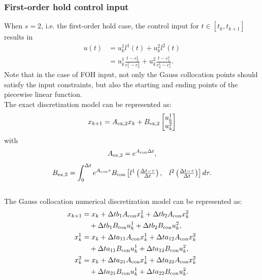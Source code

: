 \subsubsection{First-order hold control input}
When $s = 2$, i.e. the first-order hold case, the control input for $t \in \left[t_k, t_{k+1}\right]$ results in
\begin{equation}
	\begin{split}
        u(t) &= u_k^{1}  l^1(t)+u_k^2  l^2(t)\\
        &= u_k^{1}  \frac{t-c_2^1}{c_1^1-c_2^1} +u_k^2 \frac{t-c_1^1}{c_2^1-c_1^1}.
    \end{split}
\end{equation}
Note that in the case of FOH input, not only the Gauss collocation points should satisfy the input constraints, but also the starting and ending points of the piecewise linear function.
\\
The exact discretization model can be represented as:
\begin{equation}
    x_{k+1} = A_{\rm{ex,2}}x_k+B_{\rm{ex,2}}\begin{bmatrix}
    	u_{k}^1 \\
    	u_{k}^{2}
    \end{bmatrix}
\end{equation}
with
$$
A_{\rm{ex,2}} = e^{A_{\rm{con}}  \Delta t},
$$
$$
B_{\rm{ex,2}} = \int_{0}^{\Delta t} e^{A_{\rm{con}} \tau}  B_{\rm{con}}  \begin{bmatrix}
	l^1\left(\frac{\Delta t - \tau}{\Delta t}\right),      & l^2\left(\frac{\Delta t - \tau}{\Delta t}\right) 
\end{bmatrix}  d \tau.
$$
\\
The Gauss collocation numerical discretization model can be represented as:
\begin{equation}
	\begin{split}
		x_{k+1}&=x_{k}+\Delta t  b_{1}  A_{\rm{con}}  x_{k}^{1}+\Delta t  b_{2}  A_{\rm{con}}  x_{k}^{2} \\ & \quad+\Delta t  b_{1}  B_{\rm{con}}  u_{k}^{1}+\Delta t  b_{2}  B_{\rm{con}}  u_{k}^{2}, \\
		x_{k}^{1}&=x_{k}+\Delta t  a_{11}  A_{\rm{con}}  x_{k}^{1}+\Delta t  a_{12}  A_{\rm{con}}  x_{k}^{2} \\ & \quad +\Delta t  a_{11}  B_{\rm{con}}  u_{k}^{1}+\Delta t  a_{12}  B_{\rm{con}}  u_{k}^{2}, \\
		x_{k}^{2}&=x_{k}+\Delta t  a_{21}  A_{\rm{con}}  x_{k}^{1}+\Delta t  a_{22}  A_{\rm{con}}  x_{k}^{2} \\ & \quad +\Delta t  a_{21}  B_{\rm{con}}  u_{k}^{1}+\Delta t  a_{22}  B_{\rm{con}} u_{k}^{2}.
	\end{split}
	\label{firstcoll}
\end{equation}

